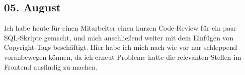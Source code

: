 \subsection{05. August}
Ich habe heute für einen Mitarbeiter einen kurzen Code-Review für ein paar SQL-Skripte gemacht, und mich anschließend weiter mit dem Einfügen von Copyright-Tags beschäftigt. Hier habe ich mich nach wie vor nur schleppend voranbewegen können, da ich erneut Probleme hatte die relevanten Stellen im Frontend ausfindig zu machen.